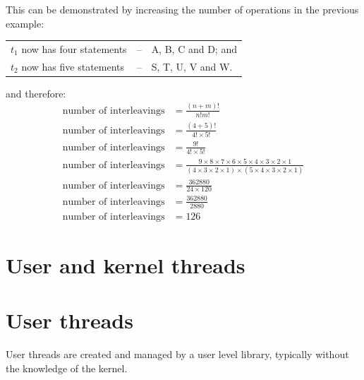 \documentclass[a4paper]{systems-software}
\begin{document}
This can be demonstrated by increasing the number of operations in the previous example:
\begin{longtabu} to \textwidth { X[2,l] X[0.2,l] X[3,l]}
	\textbullet $t_{1}$ now has four statements  & -- &
	A, B, C and D; and
	\\
	\textbullet $t_{2}$ now has five statements  & -- &
	S, T, U, V and W.
\end{longtabu}
and therefore:
\begin{equation*}
	\begin{aligned}
		\text{number of interleavings} & = \frac{(n + m)!}{n!m!} \\
		\text{number of interleavings} & = \frac{(4 + 5)!}{4!\times5!} \\
		\text{number of interleavings} & = \frac{9!}{4!\times5!} \\
		\text{number of interleavings} & = \frac{9\times8\times7\times6\times5\times4\times3\times2\times1}{(4\times3\times2\times1)\times(5\times4\times3\times2\times1)} \\
		\text{number of interleavings} & = \frac{362880}{24\times120} \\
		\text{number of interleavings} & = \frac{362880}{2880} \\
		\text{number of interleavings} & = 126
	\end{aligned}
\end{equation*}


\newpage

\section{User and kernel threads}

\section*{User threads}

User threads are created and managed by a user level library, typically without the knowledge of the kernel.
\end{document}
